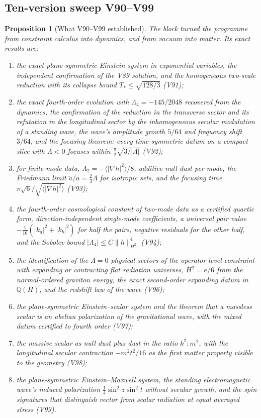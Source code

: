 \documentclass[11pt]{article}
\newtheorem{proposition}[theorem]{Proposition}
\theoremstyle{remark}
\begin{document}
\subsection{Ten-version sweep V90--V99}

\begin{proposition}[What V90--V99 established]
\label{prop:v19v100-sweep}
The block turned the programme from constraint calculus into
dynamics, and from vacuum into matter.  Its exact results are:

\begin{enumerate}
\item the exact plane-symmetric Einstein system in exponential
variables, the independent confirmation of the V89 solution, and the
homogeneous two-scale reduction with its collapse bound
\(T_*\leq\sqrt{128/3}\) (V91);
\item the exact fourth-order evolution with \(\Lambda_4=-145/2048\)
recovered from the dynamics, the confirmation of the reduction in the
transverse sector and its refutation in the longitudinal sector by
the inhomogeneous secular modulation of a standing wave, the wave's
amplitude growth \(5/64\) and frequency shift \(3/64\), and the
focusing theorem: every time-symmetric datum on a compact slice with
\(\Lambda<0\) focuses within \(\tfrac\pi2\sqrt{3/|\Lambda|}\) (V92);
\item for finite-mode data, \(\Lambda_2=-\langle|\nabla h|^2\rangle/8\),
additive null dust per mode, the Friedmann limit
\(\ddot a/a=\tfrac23\Lambda\) for isotropic sets, and the focusing time
\(\pi\sqrt6/\sqrt{\langle|\nabla h|^2\rangle}\) (V93);
\item the fourth-order cosmological constant of two-mode data as a
certified quartic form, direction-independent single-mode
coefficients, a universal pair value \(-\tfrac1{16}(|k_a|^2+|k_b|^2)\)
for half the pairs, negative residuals for the other half, and the
Sobolev bound \(|\Lambda_4|\leq C\|h\|_{H^2}^4\) (V94);
\item the identification of the \(\Lambda=0\) physical sectors of the
operator-level constraint with expanding or contracting flat radiation
universes, \(H^2=e/6\) from the normal-ordered graviton energy, the
exact second-order expanding datum in \(\mathbb Q(H)\), and the
redshift law of the wave (V96);
\item the plane-symmetric Einstein--scalar system and the theorem that
a massless scalar is an abelian polarization of the gravitational
wave, with the mixed datum certified to fourth order (V97);
\item the massive scalar as null dust plus dust in the ratio
\(k^2:m^2\), with the longitudinal secular contraction
\(-m^2t^2/16\) as the first matter property visible to the geometry
(V98);
\item the plane-symmetric Einstein--Maxwell system, the standing
electromagnetic wave's induced polarization \(\tfrac14\sin^2z\sin^2t\)
without secular growth, and the spin signatures that distinguish
vector from scalar radiation at equal averaged stress (V99).
\end{enumerate}
\end{proposition}
\end{document}
